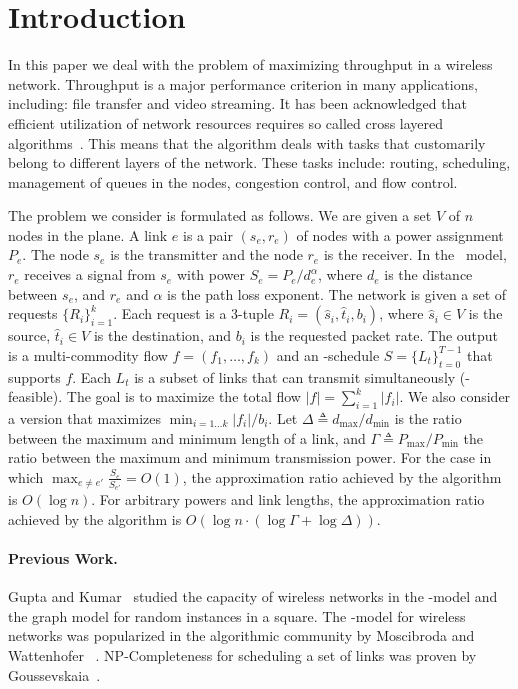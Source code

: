 \documentclass[11pt]{article}
\newenvironment{proof sketch}{\noindent {\bf Proof sketch:} }{\hfill \qed}
\newcommand{\sinr}{\text{\sc{sinr}}}
\newcommand{\eqdf}{\triangleq}
\newcommand{\pmin}{P_{\min}}
\newcommand{\pmax}{P_{\max}}
\begin{document}
\section{Introduction}
In this paper we deal with the problem of maximizing throughput in a
wireless network.  Throughput is a major performance criterion in many
applications, including: file transfer and video streaming.  It has
been acknowledged that efficient utilization of network resources
requires so called cross layered algorithms~\cite{lin2006tutorial}.
This means that the algorithm deals with tasks that customarily belong
to different layers of the network. These tasks include: routing,
scheduling, management of queues in the nodes, congestion control, and flow control.

The problem we consider is formulated as follows.  We are given a set
$V$ of $n$ nodes in the plane.  A link $e$ is a pair $(s_e,r_e)$ of
nodes with a power assignment $P_e$. The node $s_e$ is the transmitter
and the node $r_e$ is the receiver. In the \sinr\ model, $r_e$
receives a signal from $s_e$ with power $S_e=P_e / d_e^\alpha$, where
$d_e$ is the distance between $s_e$, and $r_e$ and $\alpha$ is the
path loss exponent.  The network is given a set of requests
$\{R_i\}_{i=1}^k$.  Each request is a $3$-tuple $R_i=({\hat s}_i,{\hat
  t}_i,b_i)$, where ${\hat s}_i \in V$ is the source, ${\hat t}_i \in
V$ is the destination, and $b_i$ is the requested packet rate.  The
output is a multi-commodity flow $f=(f_1,\ldots,f_k)$ and an
\sinr-schedule $S=\{L_t\}_{t=0}^{T-1}$ that supports $f$.  Each $L_t$
is a subset of links that can transmit simultaneously
(\sinr-feasible).  The goal is to maximize the total flow
$|f|=\sum_{i=1}^k |f_i|$. We also consider a version that maximizes
$\min_{i=1\ldots k} |f_i|/b_i$.  Let $\Delta\eqdf {d_{\max}} / d_{\min}$ is
the ratio between the maximum and minimum length of a link, and
$\Gamma\eqdf \pmax/\pmin$ the ratio between the maximum and minimum
transmission power.  For the case in which $\max _{e \neq e'}\frac
{S_e}{S_{e'}}=O(1)$, the approximation ratio achieved by the algorithm
is $O(\log n)$.  For arbitrary powers and link lengths, the approximation ratio
achieved by the algorithm is $O(\log n \cdot (\log\Gamma + \log
\Delta))$.

\paragraph{Previous Work.}
Gupta and Kumar~\cite{gupta2000capacity} studied the capacity of
wireless networks in the \sinr-model and the graph model for random
instances in a square.  The \sinr-model for wireless networks was
popularized in the algorithmic community by Moscibroda and Wattenhofer
~\cite{moscibroda2006complexity}. NP-Completeness for scheduling a
set of links was proven by
Goussevskaia~\cite{goussevskaia2007complexity}.
\end{document}
